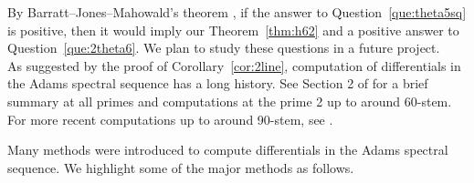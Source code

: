 \documentclass{amsart}
\numberwithin{equation}{section}
\begin{document}
By Barratt--Jones--Mahowald's theorem \cite{BJMinduction}, if the answer to Question~\ref{que:theta5sq} is positive, then it would imply our Theorem~\ref{thm:h62} and a positive answer to Question~\ref{que:2theta6}. We plan to study these questions in a future project.\\

As suggested by the proof of Corollary~\ref{cor:2line}, computation of differentials in the Adams spectral sequence has a long history. See Section 2 of \cite{WX61} for a brief summary at all primes and computations at the prime 2 up to around 60-stem. For more recent computations up to around 90-stem, see \cite{IWX, IWXsurvey, WXems, WXicm}.

Many methods were introduced to compute differentials in the Adams spectral sequence. We highlight some of the major methods as follows.
\end{document}
